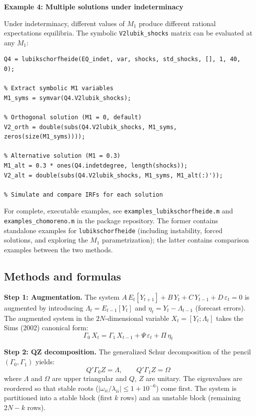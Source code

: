 \documentclass{article}
\begin{document}
\vspace{1em}
\noindent\textbf{Example 4: Multiple solutions under indeterminacy}

\medskip
\noindent Under indeterminacy, different values of $M_1$ produce different rational expectations equilibria. The symbolic \texttt{V2lubik\_shocks} matrix can be evaluated at any $M_1$:
\begin{verbatim}
Q4 = lubikschorfheide(EQ_indet, var, shocks, std_shocks, [], 1, 40, 0);

% Extract symbolic M1 variables
M1_syms = symvar(Q4.V2lubik_shocks);

% Orthogonal solution (M1 = 0, default)
V2_orth = double(subs(Q4.V2lubik_shocks, M1_syms, zeros(size(M1_syms))));

% Alternative solution (M1 = 0.3)
M1_alt = 0.3 * ones(Q4.indetdegree, length(shocks));
V2_alt = double(subs(Q4.V2lubik_shocks, M1_syms, M1_alt(:)'));

% Simulate and compare IRFs for each solution
\end{verbatim}

\medskip
\noindent For complete, executable examples, see \texttt{examples\_lubikschorfheide.m} and \texttt{examples\_chomoreno.m} in the package repository. The former contains standalone examples for \texttt{lubikschorfheide} (including instability, forced solutions, and exploring the $M_1$ parametrization); the latter contains comparison examples between the two methods.

\subsection{Methods and formulas}

\noindent\textbf{Step 1: Augmentation.} The system $A \, E_t[Y_{t+1}] + B \, Y_t + C \, Y_{t-1} + D \, \varepsilon_t = 0$ is augmented by introducing $\Lambda_t = E_{t-1}[Y_t]$ and $\eta_t = Y_t - \Lambda_{t-1}$ (forecast errors). The augmented system in the $2N$-dimensional variable $X_t = [Y_t; \Lambda_t]$ takes the Sims (2002) canonical form:
\[
\Gamma_0 \, X_t = \Gamma_1 \, X_{t-1} + \Psi \, \varepsilon_t + \Pi \, \eta_t
\]

\medskip
\noindent\textbf{Step 2: QZ decomposition.} The generalized Schur decomposition of the pencil $(\Gamma_0, \Gamma_1)$ yields:
\[
Q' \Gamma_0 Z = \Lambda, \qquad Q' \Gamma_1 Z = \Omega
\]
where $\Lambda$ and $\Omega$ are upper triangular and $Q$, $Z$ are unitary. The eigenvalues are reordered so that stable roots ($|\omega_{ii}/\lambda_{ii}| \leq 1 + 10^{-6}$) come first. The system is partitioned into a stable block (first $k$ rows) and an unstable block (remaining $2N - k$ rows).
\end{document}
